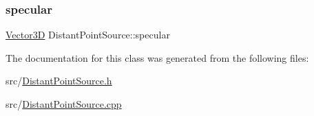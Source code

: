 \subsubsection{\texorpdfstring{specular}{specular}}
{\footnotesize\ttfamily \mbox{\hyperlink{classVector3D}{Vector3D}} Distant\+Point\+Source\+::specular\hspace{0.3cm}{\ttfamily [private]}}



The documentation for this class was generated from the following files\+:\begin{DoxyCompactItemize}
\item 
src/\mbox{\hyperlink{DistantPointSource_8h}{Distant\+Point\+Source.\+h}}\item 
src/\mbox{\hyperlink{DistantPointSource_8cpp}{Distant\+Point\+Source.\+cpp}}\end{DoxyCompactItemize}
